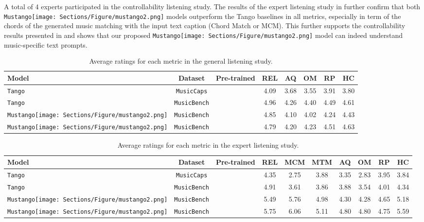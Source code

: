 \documentclass[11pt]{article}
\newcommand{\cmark}{\ding{51}}\newcommand{\xmark}{\ding{55}}\newcommand{\dataset}{\texttt{MusicBench}}
\newcommand{\model}{\texttt{Mustango}}
\newcommand{\modelemoji}{\model{}\texttt{[image: Sections/Figure/mustango2.png]}}
\newcommand{\greencheck}{{\color{green}\cmark}}
\newcommand{\redcross}{{\color{red}\xmark}}
\begin{document}
A total of 4 experts participated in the controllability listening study. The results of the expert listening study in  further confirm that both \modelemoji{} models outperform  the Tango baselines in all metrics, especially in term of the chords of the generated music matching with the input text caption (Chord Match or MCM). This further supports the controllability results presented in  and shows that our proposed \modelemoji{} model can indeed understand music-specific text prompts. 


\begin{table}[h!]
    \centering
    \begin{adjustbox}{width=1\linewidth,center}
    \begin{tabular}{lccccccc}
    \toprule
      Model & Dataset & Pre-trained & REL & AQ & OM & RP & HC  \\
    \midrule
     \texttt{Tango} & \texttt{MusicCaps} & \greencheck & 4.09 & 3.68 & 3.55 & 3.91 & 3.80   \\
     \texttt{Tango} & \dataset{} & \greencheck & 4.96 & 4.26 & 4.40 & 4.49 & 4.61  \\
     \modelemoji{} & \dataset{} & \greencheck & 4.85 & 4.10 & 4.02 & 4.24 & 4.43  \\
     \modelemoji{} & \dataset{} & \redcross & 4.79 & 4.20 & 4.23 & 4.51 & 4.63  \\
    \bottomrule
    \end{tabular}
        \end{adjustbox}
    \caption{Average ratings for each metric in the general listening study. 
}
    \label{tab:subj_eval}
\end{table}


\begin{table}[h!]
    \centering
    \begin{adjustbox}{width=1\linewidth,center}
    \begin{tabular}{lccccccccc}
    \toprule
      Model & Dataset & Pre-trained & REL & MCM & MTM & AQ & OM & RP & HC  \\
    \midrule
     \texttt{Tango} & \texttt{MusicCaps} & \greencheck &  4.35 & 2.75 & 3.88 & 3.35 & 2.83 & 3.95 & 3.84  \\
     \texttt{Tango} & \dataset{} & \greencheck & 4.91 & 3.61 & 3.86 & 3.88 & 3.54 & 4.01 & 4.34  \\
     \modelemoji{} & \dataset{} & \greencheck & 5.49 & 5.76 & 4.98 & 4.30 & 4.28 & 4.65 & 5.18  \\
    \modelemoji{} & \dataset{} & \redcross & 5.75 & 6.06 & 5.11 & 4.80 & 4.80 & 4.75 & 5.59  \\
    \bottomrule
    \end{tabular}
        \end{adjustbox}
    \caption{Average ratings for each metric in the expert listening study. 
}
    \label{tab:expert_eval}
\end{table}
\end{document}
